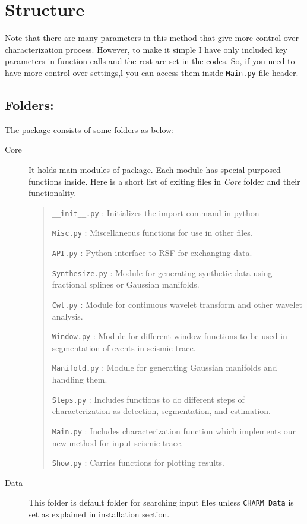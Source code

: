 \documentclass[12pt,titlepage]{article}
\begin{document}
\section*{Structure}
Note that there are many parameters in this method that give more control over characterization process. However, to make it simple I have only included key parameters in function calls and the rest are set in the codes. So, if you need to have  more control over settings,l  you can access them inside \texttt{Main.py} file header.
\subsection*{Folders:}
The package consists of some folders as below:

\begin{description}
\item [Core] It holds main modules of package. Each module has special purposed functions inside. Here is a short list of exiting files in \textit{Core} folder and their functionality.

  \begin{verse}
    \texttt{\_\_init\_\_.py} : Initializes the import command in
    python

    \texttt{Misc.py}	: Miscellaneous functions for use in other files.

    \texttt{API.py} : Python interface to RSF for exchanging data.

    \texttt{Synthesize.py} : Module for generating synthetic data using fractional splines or Gaussian manifolds.

    \texttt{Cwt.py} : Module for continuous wavelet transform and other wavelet analysis.

    \texttt{Window.py} : Module for different window functions to be used in segmentation of events in seismic trace.

    \texttt{Manifold.py} : Module for generating Gaussian manifolds and handling them.

    \texttt{Steps.py} : Includes functions to do different steps of characterization as detection, segmentation, and estimation.

    \texttt{Main.py} : Includes characterization function which implements our new method for input seismic trace.

    \texttt{Show.py} : Carries functions for plotting results.
  \end{verse}


\item [Data] This folder is default folder for searching input files
  unless \texttt{CHARM\_Data} is set as explained in installation
  section.


\end{description}
\end{document}
